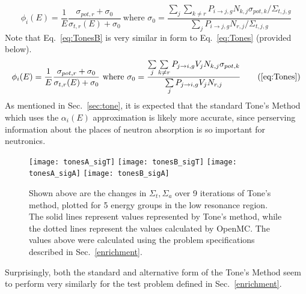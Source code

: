 \documentclass[10pt]{article}
\begin{document}
  \begin{equation}\phi_i(E)=\frac{1}{E}\frac{\sigma_{pot,r}+\sigma_{0}}{\sigma_{t,r}(E)+\sigma_{0}}~\mbox{where }\sigma_{0}=\frac{\sum\limits_j\sum\limits_{k\neq r}P_{i\rightarrow j,g}N_{k,j}\sigma_{pot,k}\Big/\Sigma_{t,j,g} }{\sum\limits_jP_{i\rightarrow j,g}N_{r,j}\Big/\Sigma_{t,j,g}}\label{eq:TonesB}\end{equation}
Note that Eq.~\ref{eq:TonesB} is very similar in form to Eq.~\ref{eq:Tones} (provided below). 
\begin{equation}\phi_i(E)=\frac{1}{E}\frac{\sigma_{pot,r}+\sigma_{0}}{\sigma_{t,r}(E)+\sigma_{0}}~\mbox{where }\sigma_{0}=\frac{\sum\limits_j\sum\limits_{k\neq r}P_{j\rightarrow i,g}V_{j}N_{k,j}\sigma_{pot,k}}{\sum\limits_jP_{j\rightarrow i,g}V_{j}N_{r,j}}\tag{\ref{eq:Tones}}\end{equation}
As mentioned in Sec.~\ref{sec:tone}, it is expected that the standard Tone's Method which uses the $\alpha_i(E)$ approximation is likely more accurate, since perserving information about the places of neutron absorption is so important for neutronics.


  \begin{figure}[H]
    \begin{center}
    \texttt{[image: tonesA\_sigT]}
    \texttt{[image: tonesB\_sigT]}
    \texttt{[image: tonesA\_sigA]}
    \texttt{[image: tonesB\_sigA]}

      \caption{Shown above are the changes in $\Sigma_t,\Sigma_a$ over 9 iterations of Tone's method, plotted for 5 energy groups in the low resonance region. The solid lines represent values represented by Tone's method, while the dotted lines represent the values calculated by OpenMC. The values above were calculated using the problem specifications described in Sec.~\ref{enrichment}.}
      \label{fig:results1}
    \end{center}
  \end{figure}

Surprisingly, both the standard and alternative form of the Tone's Method seem to perform very similarly for the test problem defined in Sec.~\ref{enrichment}. 
\end{document}
